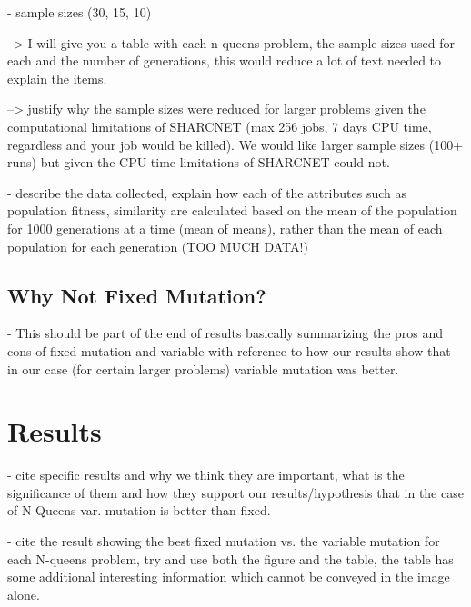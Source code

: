 \documentclass{sig-alternate}
\begin{document}
- sample sizes (30, 15, 10)

    --> I will give you a table with each n queens problem, the sample sizes used 
        for each and the number of generations, this would reduce a lot of text
        needed to explain the items.

    --> justify why the sample sizes were reduced for larger problems given the 
        computational limitations of SHARCNET (max 256 jobs, 7 days CPU time, 
        regardless and your job would be killed). We would like larger sample sizes
        (100+ runs) but given the CPU time limitations of SHARCNET could not.

- describe the data collected, explain how each of the attributes such as
  population fitness, similarity are calculated based on the mean of the population
  for 1000 generations at a time (mean of means), rather than the mean of each
  population for each generation (TOO MUCH DATA!)



\subsection{Why Not Fixed Mutation?}

- This should be part of the end of results basically summarizing the pros
  and cons of fixed mutation and variable with reference to how our results
  show that in our case (for certain larger problems) variable mutation was better.




% 
%
\section{Results}

- cite specific results and why we think they are important, what is the significance
  of them and how they support our results/hypothesis that in the case of N Queens
  var. mutation is better than fixed.

- cite the result showing the best fixed mutation vs. the variable mutation
  for each N-queens problem, try and use both the figure and the table, the table
  has some additional interesting information which cannot be conveyed in the
  image alone.
  
\end{document}
